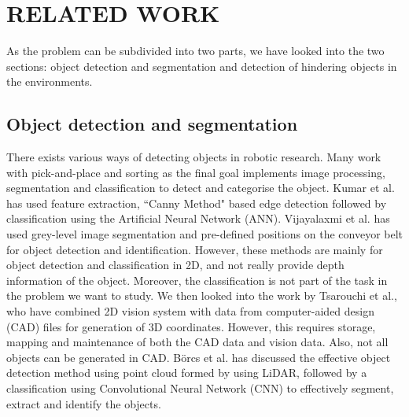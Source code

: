 \section{RELATED WORK}
As the problem can be subdivided into two parts, we have looked into the two sections: object detection and segmentation and detection of hindering objects in the environments. 
\subsection{Object detection and segmentation}
There exists various ways of detecting objects in robotic research. Many work with pick-and-place and sorting as the final goal implements image processing, segmentation and 
classification to detect and categorise the object. Kumar et al. has used feature extraction, ``Canny Method" based edge detection followed by classification using the Artificial Neural Network (ANN)\cite{kumar2014}. Vijayalaxmi et al. has used grey-level image segmentation and pre-defined positions on the conveyor belt for object detection and identification\cite{VIJAYALAXMI2013}. However, these methods are mainly for object detection and classification in 2D, and not really provide depth information of the object. Moreover, the classification is not part of the task in the problem we want to study. We then looked into the work by Tsarouchi et al., who have combined 2D vision system with data from computer-aided design (CAD) files for generation of 3D coordinates\cite{Tsarouchi2016}. However, this requires storage, mapping and maintenance of both the CAD data and vision data. Also, not all objects can be generated in CAD. 
Börcs et al. has discussed the effective object detection method using point cloud formed by using LiDAR, followed by a classification using Convolutional Neural Network (CNN) to effectively segment, extract and identify the objects\cite{Borcs2017}. 


